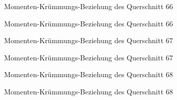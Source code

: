 \documentclass[
  11pt,
  letterpaper,
]{scrreprt}
\begin{document}
\begin{figure}[H]


\caption{\label{fig-qs_66}Momenten-Krümmungs-Beziehung des Querschnitt
66}

\end{figure}%

\begin{figure}[H]


\caption{\label{fig-m_chi_66}Momenten-Krümmungs-Beziehung des
Querschnitt 66}

\end{figure}%

\begin{figure}[H]


\caption{\label{fig-qs_67}Momenten-Krümmungs-Beziehung des Querschnitt
67}

\end{figure}%

\begin{figure}[H]


\caption{\label{fig-m_chi_67}Momenten-Krümmungs-Beziehung des
Querschnitt 67}

\end{figure}%

\begin{figure}[H]


\caption{\label{fig-qs_68}Momenten-Krümmungs-Beziehung des Querschnitt
68}

\end{figure}%

\begin{figure}[H]


\caption{\label{fig-m_chi_68}Momenten-Krümmungs-Beziehung des
Querschnitt 68}

\end{figure}%
\end{document}
